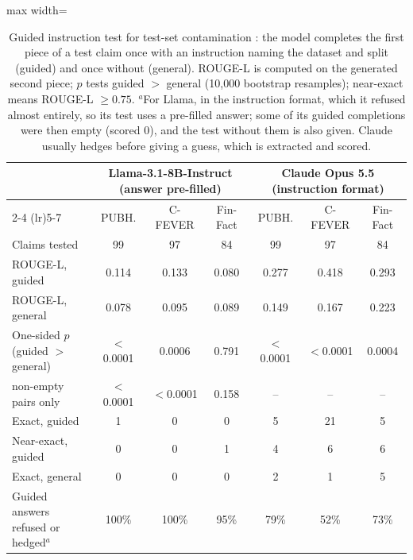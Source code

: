\begin{table}[t]\centering\small\setlength{\tabcolsep}{5pt}
\begin{adjustbox}{max width=\textwidth}\begin{tabular}{lcccccc}
\toprule
 & \multicolumn{3}{c}{Llama-3.1-8B-Instruct (answer pre-filled)} & \multicolumn{3}{c}{Claude Opus 5.5 (instruction format)} \\
\cmidrule(lr){2-4} \cmidrule(lr){5-7}
 & PUBH. & C-FEVER & Fin-Fact & PUBH. & C-FEVER & Fin-Fact \\
\midrule
Claims tested & 99 & 97 & 84 & 99 & 97 & 84 \\
ROUGE-L, guided & 0.114 & 0.133 & 0.080 & 0.277 & 0.418 & 0.293 \\
ROUGE-L, general & 0.078 & 0.095 & 0.089 & 0.149 & 0.167 & 0.223 \\
One-sided $p$ (guided $>$ general) & $<$0.0001 & 0.0006 & 0.791 & $<$0.0001 & $<$0.0001 & 0.0004 \\
\quad non-empty pairs only & $<$0.0001 & $<$0.0001 & 0.158 & -- & -- & -- \\
Exact, guided & 1 & 0 & 0 & 5 & 21 & 5 \\
Near-exact, guided & 0 & 0 & 1 & 4 & 6 & 6 \\
Exact, general & 0 & 0 & 0 & 2 & 1 & 5 \\
Guided answers refused or hedged$^{a}$ & 100\% & 100\% & 95\% & 79\% & 52\% & 73\% \\
\bottomrule
\end{tabular}\end{adjustbox}
\caption{Guided instruction test for test-set contamination \citep{golchin2024timetravel}: the model completes the first piece of a test claim once with an instruction naming the dataset and split (guided) and once without (general). ROUGE-L \citep{lin2004rouge} is computed on the generated second piece; $p$ tests guided $>$ general (10,000 bootstrap resamples); near-exact means ROUGE-L $\geq 0.75$. $^{a}$For Llama, in the instruction format, which it refused almost entirely, so its test uses a pre-filled answer; some of its guided completions were then empty (scored 0), and the test without them is also given. Claude usually hedges before giving a guess, which is extracted and scored.}
\label{tab:contamination}
\end{table}
